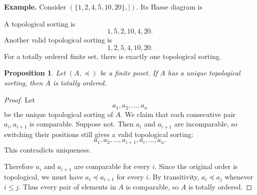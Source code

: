 \documentclass{article}
\newtheorem*{proposition}{Proposition}
\begin{document}
\textbf{Example.} Consider $(\{1,2,4,5,10,20\}, \mid)$. Its Hasse diagram is
\begin{center}
\end{center}
A topological sorting is
\[
1, 5, 2, 10, 4, 20.
\]
Another valid topological sorting is
\[
1, 2, 5, 4, 10, 20.
\]
For a totally ordered finite set, there is exactly one topological sorting.

\begin{proposition}
Let $(A, \preceq)$ be a finite poset. If $A$ has a unique topological sorting, then $A$ is totally ordered.
\end{proposition}

\begin{proof}
Let
\[
a_1, a_2, \dots, a_n
\]
be the unique topological sorting of $A$. We claim that each consecutive pair $a_i, a_{i+1}$ is comparable. Suppose not. Then $a_i$ and $a_{i+1}$ are incomparable, so switching their positions still gives a valid topological sorting:
\[
a_1, a_2, \dots, a_{i+1}, a_i, \dots, a_n.
\]
This contradicts uniqueness.

Therefore $a_i$ and $a_{i+1}$ are comparable for every $i$. Since the original order is topological, we must have $a_i \preceq a_{i+1}$ for every $i$. By transitivity, $a_i \preceq a_j$ whenever $i \le j$. Thus every pair of elements in $A$ is comparable, so $A$ is totally ordered.
\end{proof}
\end{document}
